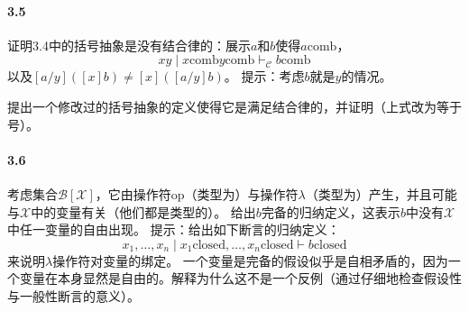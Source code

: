 \paragraph{3.5}
证明3.4中的括号抽象是没有结合律的：展示$a$和$b$使得$a \text{comb}$，
$$x y \mid x \text{comb} y \text{comb} \vdash_{\mathcal{C}} b \text{comb} $$
以及$[a/y]([x]b) \neq [x] ([a / y]b)$。
提示：考虑$b$就是$y$的情况。

提出一个修改过的括号抽象的定义使得它是满足结合律的，并证明（上式改为等于号）。

\paragraph{3.6}
考虑集合$\mathcal{B}[\mathcal{X}]$，它由操作符op（类型为）与操作符$\lambda$（类型为）产生，并且可能与$\mathcal{X}$中的变量有关（他们都是类型的）。
给出$b$完备的归纳定义，这表示$b$中没有$\mathcal{X}$中任一变量的自由出现。
提示：给出如下断言的归纳定义：
$$x_1,\dots,x_n \mid x_1 \text{closed}, \dots , x_n \text{closed} \vdash b \text{closed} $$
来说明$\lambda$操作符对变量的绑定。
一个变量是完备的假设似乎是自相矛盾的，因为一个变量在本身显然是自由的。解释为什么这不是一个反例（通过仔细地检查假设性与一般性断言的意义）。